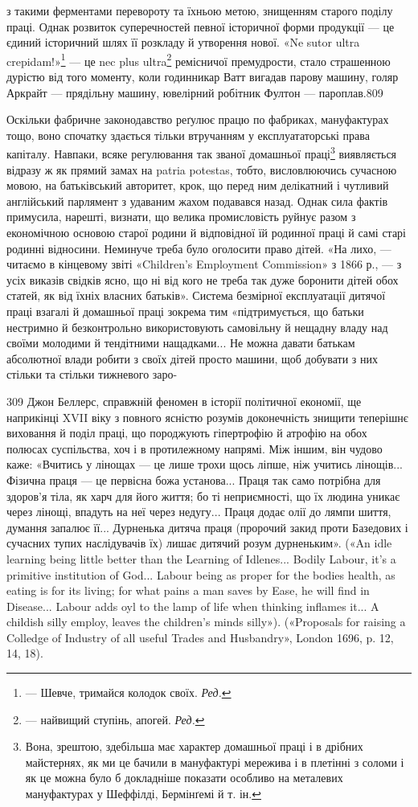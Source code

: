 з такими ферментами перевороту та їхньою метою, знищенням
старого поділу праці. Однак розвиток суперечностей певної історичної
форми продукції — це єдиний історичний шлях її розкладу
й утворення нової. «Ne sutor ultra crepidam!»\footnote*{
— Шевче, тримайся колодок своїх. \emph{Ред.}
} — це nec plus
ultra\footnote*{
— найвищий ступінь, апогей. \emph{Ред.}
} ремісничої премудрости, стало страшенною дурістю від
того моменту, коли годинникар Ватт вигадав парову машину,
голяр Аркрайт — прядільну машину, ювелірний робітник Фултон
— пароплав.809

Оскільки фабричне законодавство реґулює працю по фабриках,
мануфактурах тощо, воно спочатку здається тільки втручанням
у експлуататорські права капіталу. Навпаки, всяке регулювання
так званої домашньої праці\footnote{
Вона, зрештою, здебільша має характер домашньої праці і в
дрібних майстернях, як ми це бачили в мануфактурі мережива і в плетінні
з соломи і як це можна було б докладніше показати особливо на металевих
мануфактурах у Шеффілді, Бермінґемі й т. ін.
} виявляється відразу ж
як прямий замах на patria potestas, тобто, висловлюючись сучасною
мовою, на батьківський авторитет, крок, що перед ним делікатний
і чутливий англійський парлямент з удаваним жахом
подавався назад. Однак сила фактів примусила, нарешті, визнати,
що велика промисловість руйнує разом з економічною основою
старої родини й відповідної їй родинної праці й самі старі родинні
відносини. Неминуче треба було оголосити право дітей. «На лихо,
— читаємо в кінцевому звіті «Children’s Employment Commission»
з 1866 р., — з усіх виказів свідків ясно, що ні від кого
не треба так дуже боронити дітей обох статей, як від їхніх власних
батьків». Система безмірної експлуатації дитячої праці взагалі
й домашньої праці зокрема тим «підтримується, що батьки нестримно
й безконтрольно використовують самовільну й нещадну
владу над своїми молодими й тендітними нащадками... Не можна
давати батькам абсолютної влади робити з своїх дітей просто
машини, щоб добувати з них стільки та стільки тижневого заро-

309    Джон Беллерс, справжній феномен в історії політичної економії,
ще наприкінці XVII віку з повного ясністю розумів доконечність знищити
теперішнє виховання й поділ праці, що породжують гіпертрофію й атрофію
на обох полюсах суспільства, хоч і в протилежному напрямі. Між
іншим, він чудово каже: «Вчитись у лінощах — це лише трохи щось ліпше,
ніж учитись лінощів... Фізична праця — це первісна божа установа...
Праця так само потрібна для здоров’я тіла, як харч для його життя;
бо ті неприємності, що їх людина уникає через лінощі, впадуть на неї
через недугу... Праця додає олії до лямпи шиття, думання запалює її...
Дурненька дитяча праця (пророчий закид проти Базедових і сучасних
тупих наслідувачів їх) лишає дитячий розум дурненьким». («An idle
learning being little better than the Learning of Idlenes... Bodily Labour,
it’s a primitive institution of God... Labour being as proper for the
bodies health, as eating is for its living; for what pains a man saves by
Ease, he will find in Disease... Labour adds oyl to the lamp of life when
thinking inflames it... A childish silly employ, leaves the children’s minds
silly»). («Proposals for raising a Colledge of Industry of all useful Trades
and Husbandry», London 1696, p. 12, 14, 18).